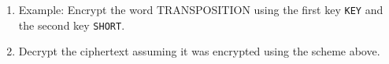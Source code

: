 \documentclass[12pt]{article}
\newcommand{\be}{\begin{enumerate}}
\newcommand{\ee}{\end{enumerate}}
\begin{document}
\begin{enumerate}
\newpage

\be

\item Example: Encrypt the word TRANSPOSITION using the first key {\tt KEY} and the second key {\tt SHORT}.

\vfill


\item Decrypt the ciphertext  assuming it was encrypted using the scheme above.

\vfill
\ee


\end{enumerate}
\end{document}
